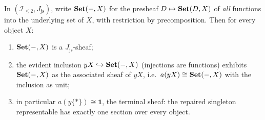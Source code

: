 \begin{proposition}\label{ch06:prop:computed}
In $(\mathcal{I}_{\le 2},J_{\mathrm{js}})$, write $\mathbf{Set}(-,X)$ for the
presheaf $D\mapsto\mathbf{Set}(D,X)$ of \emph{all} functions into the underlying
set of $X$, with restriction by precomposition. Then for every object $X$:
\begin{enumerate}
\item $\mathbf{Set}(-,X)$ is a $J_{\mathrm{js}}$-sheaf;
\item the evident inclusion $yX\hookrightarrow\mathbf{Set}(-,X)$ (injections are
functions) exhibits $\mathbf{Set}(-,X)$ as the associated sheaf of $yX$, i.e.\
$a(yX)\cong\mathbf{Set}(-,X)$ with the inclusion as unit;
\item in particular $a(y\{*\})\cong\mathbf{1}$, the terminal sheaf: the
repaired singleton representable has exactly one section over every
object.
\end{enumerate}
\end{proposition}


